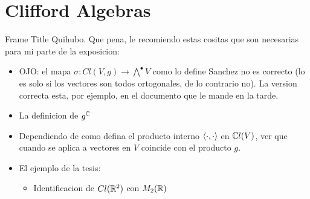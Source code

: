 \section{Clifford Algebras}



\begin{frame}{Frame Title} %
    \tiny
    Quihubo. Que pena, le recomiendo estas cositas que son necesarias para mi parte de la exposicion:
    
        \begin{itemize}
        
        \item OJO: el mapa $\sigma : Cl(V, g) \to \bigwedge ^\bullet V$ como lo define Sanchez no es correcto (lo es solo si los vectores son todos ortogonales, de lo contrario no). La version correcta esta, por ejemplo, en el documento que le mande en la tarde.
        
        \item La definicion de $g^\mathbb C$
        
        \item Dependiendo de como defina el producto interno $\langle \cdot, \cdot \rangle$ en $\mathbb C l(V)$, ver que cuando se aplica a vectores en $V$ coincide con el producto $g$.
        
        \item El ejemplo de la tesis: 
        
            \begin{itemize}
                
            \item \tiny Identificacion de $Cl(\mathbb R^2)$ con $M_2(\mathbb R)$
            \end{itemize}
            
        \end{itemize}
    
    \normalsize
\end{frame}


